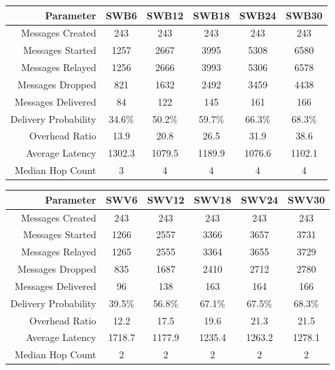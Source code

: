 \documentclass{article}
\begin{document}
\begin{center}
\vspace{6px}
\begin{tabular}{|r|c|c|c|c|c|}
\hline
\textbf{Parameter} & \textbf{SWB6} & \textbf{SWB12} & \textbf{SWB18} & \textbf{SWB24} & \textbf{SWB30} \\ \hline
Messages Created & 243 & 243 & 243 & 243 & 243 \\ \hline
Messages Started & 1257 & 2667 & 3995 & 5308 & 6580 \\ \hline
Messages Relayed & 1256 & 2666 & 3993 & 5306 & 6578 \\ \hline
Messages Dropped & 821 & 1632 & 2492 & 3459 & 4438 \\ \hline
Messages Delivered & 84 & 122 & 145 & 161 & 166 \\ \hline
Delivery Probability & 34.6\% & 50.2\% & 59.7\% & 66.3\% & 68.3\% \\ \hline
Overhead Ratio & 13.9 & 20.8 & 26.5 & 31.9 & 38.6 \\ \hline
Average Latency & 1302.3 & 1079.5 & 1189.9 & 1076.6 & 1102.1 \\ \hline
Median Hop Count & 3 & 4 & 4 & 4 & 4\\ \hline
\end{tabular}
\end{center}

\begin{center}
\vspace{6px}
\begin{tabular}{|r|c|c|c|c|c|}
\hline
\textbf{Parameter} & \textbf{SWV6} & \textbf{SWV12} & \textbf{SWV18} & \textbf{SWV24} & \textbf{SWV30} \\ \hline
Messages Created & 243 & 243 & 243 & 243 & 243 \\ \hline
Messages Started & 1266 & 2557 & 3366 & 3657 & 3731 \\ \hline
Messages Relayed & 1265 & 2555 & 3364 & 3655 & 3729 \\ \hline
Messages Dropped & 835 & 1687 & 2410 & 2712 & 2780 \\ \hline
Messages Delivered & 96 & 138 & 163 & 164 & 166 \\ \hline
Delivery Probability & 39.5\% & 56.8\% & 67.1\% & 67.5\% & 68.3\%\\ \hline
Overhead Ratio & 12.2 & 17.5 & 19.6 & 21.3 & 21.5 \\ \hline
Average Latency & 1718.7 & 1177.9 & 1235.4 & 1263.2 & 1278.1 \\ \hline
Median Hop Count & 2 & 2 & 2 & 2 & 2\\ \hline
\end{tabular}
\end{center}
\end{document}
